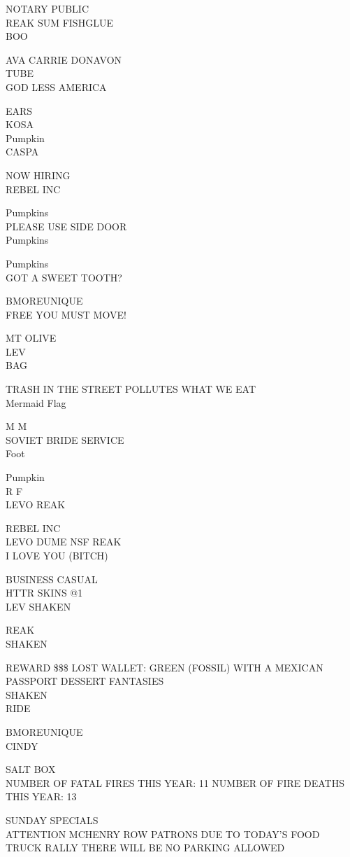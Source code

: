 \documentclass[10pt,letterpaper]{article}
\begin{document}
NOTARY PUBLIC\\
REAK SUM FISHGLUE\\
BOO

AVA CARRIE DONAVON\\
TUBE\\
GOD LESS AMERICA

EARS\\
KOSA\\
Pumpkin\\
CASPA

NOW HIRING\\
REBEL INC

Pumpkins\\
PLEASE USE SIDE DOOR\\
Pumpkins

Pumpkins\\
GOT A SWEET TOOTH?

BMOREUNIQUE\\
FREE YOU MUST MOVE!

MT OLIVE\\
LEV\\
BAG

TRASH IN THE STREET POLLUTES WHAT WE EAT\\
Mermaid Flag

M M\\
SOVIET BRIDE SERVICE\\
Foot

Pumpkin\\
R F\\
LEVO REAK

REBEL INC\\
LEVO DUME NSF REAK\\
I LOVE YOU (BITCH)

BUSINESS CASUAL\\
HTTR SKINS @1\\
LEV SHAKEN

REAK\\
SHAKEN

REWARD \$\$\$ LOST WALLET: GREEN (FOSSIL) WITH A MEXICAN PASSPORT DESSERT FANTASIES\\
SHAKEN\\
RIDE

BMOREUNIQUE\\
CINDY

SALT BOX\\
NUMBER OF FATAL FIRES THIS YEAR: 11 NUMBER OF FIRE DEATHS THIS YEAR: 13

SUNDAY SPECIALS\\
ATTENTION MCHENRY ROW PATRONS DUE TO TODAY'S FOOD TRUCK RALLY THERE WILL BE NO PARKING ALLOWED
\end{document}

